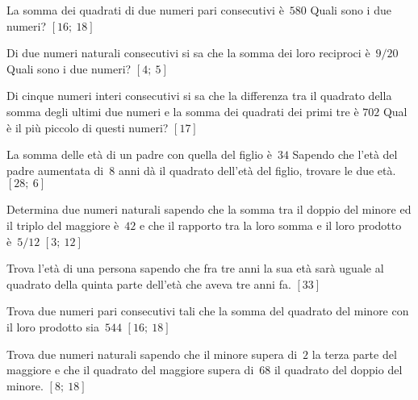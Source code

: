 \begin{multicols}{2}
\begin{esercizio}[\Ast]
 \label{ese:3.118}
La somma dei quadrati di due numeri pari consecutivi è~\(580\) Quali sono i
due numeri?
\hfill\(\left[16;~18\right]\)
\end{esercizio}

\begin{esercizio}[\Ast]
 \label{ese:3.119}
Di due numeri naturali consecutivi si sa che la somma dei loro reciproci
è~\(9/20\) Quali sono i due numeri?
\hfill\(\left[4;~5\right]\)
\end{esercizio}

\begin{esercizio}[\Ast]
 \label{ese:3.120}
Di cinque numeri interi consecutivi si sa che la differenza tra il quadrato
della somma degli ultimi due numeri e la somma dei quadrati dei primi tre è
\( 702\) Qual è il più piccolo di questi numeri?
\hfill\(\left[17\right]\)
\end{esercizio}

 \begin{esercizio}[\Ast]
 \label{ese:3.121}
La somma delle età di un padre con quella del figlio è~\(34\) Sapendo che
l'età del padre aumentata di~\(8\) anni dà il quadrato dell'età del figlio,
trovare le due età.
\hfill\(\left[28;~6\right]\)
\end{esercizio}

\begin{esercizio}[\Ast]
 \label{ese:3.122}
Determina due numeri naturali sapendo che la somma tra il doppio del minore
ed il triplo del maggiore è~\(42\) e che il rapporto tra la loro somma e il 
loro
prodotto è~\(5/12\)
\hfill\(\left[3;~12\right]\)
\end{esercizio}

\begin{esercizio}[\Ast]
 \label{ese:3.123}
Trova l'età di una persona sapendo che fra tre anni la sua età sarà
uguale al quadrato della quinta parte dell'età che aveva tre anni fa.
\hfill\(\left[33\right]\)
\end{esercizio}

\begin{esercizio}[\Ast]
 \label{ese:3.124}
Trova due numeri pari consecutivi tali che la somma del quadrato del minore
con il loro prodotto sia~\(544\)
\hfill\(\left[16;~18\right]\)
\end{esercizio}

\begin{esercizio}[\Ast]
 \label{ese:3.125}
Trova due numeri naturali sapendo che il minore supera di~\(2\) la terza 
parte
del maggiore e che il quadrato del maggiore supera di~\(68\) il quadrato del
doppio del minore.
\hfill\(\left[8;~18\right]\)
\end{esercizio}


\end{multicols}
